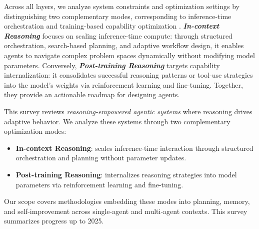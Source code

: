 Across all layers, we analyze system constraints and optimization settings by distinguishing two complementary modes, corresponding to inference-time orchestration \cite{yao2023react,shinn2023reflexion,ni2024tree,li2025search,xu2025mem,wei2025evo} and training-based capability optimization \cite{ma2024coevolving,jin2025search,wei2025webagent,yan2025memoryr1}. \emph{\textbf{In-context Reasoning}} focuses on scaling inference-time compute: through structured orchestration, search-based planning, and adaptive workflow design, it enables agents to navigate complex problem spaces dynamically without modifying model parameters. Conversely, \emph{\textbf{Post-training Reasoning}} targets capability internalization: it consolidates successful reasoning patterns or tool-use strategies into the model's weights via reinforcement learning and fine-tuning. Together, they provide an actionable roadmap for designing agents.


\begin{tcolorbox}[
  agentscope,
  float,
  floatplacement=t
]
This survey reviews \emph{reasoning-empowered agentic systems} where reasoning drives adaptive behavior. We analyze these systems through two complementary optimization modes:
\begin{itemize}
    \item \textbf{In-context Reasoning}: scales inference-time interaction through structured orchestration and planning without parameter updates.
    \item \textbf{Post-training Reasoning}: internalizes reasoning strategies into model parameters via reinforcement learning and fine-tuning.
\end{itemize}
Our scope covers methodologies embedding these modes into planning, memory, and self-improvement across single-agent and multi-agent contexts. This survey summarizes progress up to 2025.
\end{tcolorbox}



